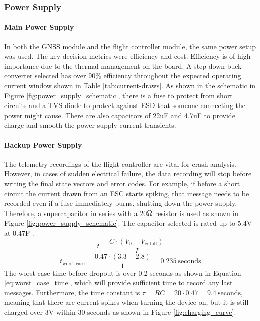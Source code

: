 \subsubsection{Power Supply}\label{sub_sub_section:tgt_power_supply}

\paragraph{Main Power Supply}
In both the GNSS module and the flight controller module, the same power setup was used. The key decision metrics were efficiency and cost.  Efficiency is of high importance due to the thermal management on the board. A step-down buck converter selected has over 90\% efficiency throughout the expected operating current window \cite{ti} shown in Table \ref{tab:current-draws}. As shown in the schematic in Figure \ref{fig:power_supply_schematic}, there is a fuse to protect from short circuits and a \gls{TVS} diode to protect against \gls{ESD} that someone connecting the power might cause. There are also capacitors of 22uF and 4.7uF to provide charge and smooth the power supply current transients.

\paragraph{Backup Power Supply}
The telemetry recordings of the flight controller are vital for crash analysis. However, in cases of sudden electrical failure, the data recording will stop before writing the final state vectors and error codes. For example, if before a short circuit the current drawn from an \gls{ESC} starts spiking, that message needs to be recorded even if a fuse immediately burns, shutting down the power supply. Therefore, a supercapacitor in series with a 20$\ohm$ resistor is used as shown in Figure \ref{fig:power_supply_schematic}. The capacitor selected is rated up to 5.4V at 0.47F \cite{rs_supercap}. 
\begin{equation}
t = \frac{C \cdot (V_0 - V_{\text{cutoff}})}{I}
\label{eq:discharge_time}
\end{equation}
\begin{equation}
t_{\text{worst-case}} = \frac{0.47 \cdot (3.3 - 2.8)}{1} = 0.235\ \text{seconds}
\label{eq:worst_case_time}
\end{equation}
The worst-case time before dropout is over 0.2 seconds as shown in Equation \ref{eq:worst_case_time}, which will provide sufficient time to record any last messages. Furthermore, the time constant is $\tau = RC = 20 \cdot 0.47 = 9.4\ \text{seconds}$, meaning that there are current spikes when turning the device on, but it is still charged over 3V within 30 seconds as shown in Figure \ref{fig:charging_curve}.

